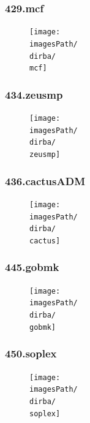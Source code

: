 \documentclass[12pt,a4paper]{article}
\newcommand{\imagesPath}{/home/nick/arch-ntua/ex02/graphs}
\newcommand{\mcf}{429.mcf.cslab_branch_predictors.out.pdf}
\newcommand{\zeusmp}{434.zeusmp.cslab_branch_predictors.out.pdf}
\newcommand{\cactus}{436.cactusADM.cslab_branch_predictors.out.pdf}
\newcommand{\gobmk}{445.gobmk.cslab_branch_predictors.out.pdf}
\newcommand{\soplex}{450.soplex.cslab_branch_predictors.out.pdf}
\newcommand{\dirba}{4.2/i}
\begin{document}
				\subsubsection{429.mcf}
					\begin{figure}[H]
						\begin{center}
							 \texttt{[image: \\imagesPath/\\dirba/\\mcf]}
						\end{center}
					\end{figure}

				\subsubsection{434.zeusmp}
					\begin{figure}[H]
						\begin{center}
							 \texttt{[image: \\imagesPath/\\dirba/\\zeusmp]}
						\end{center}
					\end{figure}

				\subsubsection{436.cactusADM}
					\begin{figure}[H]
						\begin{center}
							 \texttt{[image: \\imagesPath/\\dirba/\\cactus]}
						\end{center}
					\end{figure}

				\subsubsection{445.gobmk}
					\begin{figure}[H]
						\begin{center}
							 \texttt{[image: \\imagesPath/\\dirba/\\gobmk]}
						\end{center}
					\end{figure}

				\subsubsection{450.soplex}
					\begin{figure}[H]
						\begin{center}
							 \texttt{[image: \\imagesPath/\\dirba/\\soplex]}
						\end{center}
					\end{figure}
\end{document}
